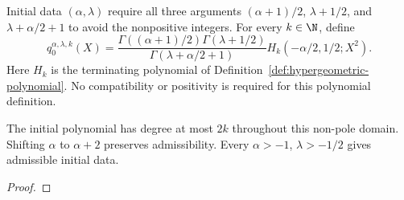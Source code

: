\begin{supporting}
\begin{definition}
\label{def:power-law-initial-polynomial}
\leanok
Initial data $(\alpha,\lambda)$ require all three arguments
$(\alpha+1)/2$, $\lambda+1/2$, and $\lambda+\alpha/2+1$ to avoid the
nonpositive integers. For every $k\in\N$, define
\[
 q_0^{\alpha,\lambda,k}(X)=
 \frac{\Gamma((\alpha+1)/2)\Gamma(\lambda+1/2)}{\Gamma(\lambda+\alpha/2+1)}
 H_k(-\alpha/2,1/2;X^2).
\]
Here $H_k$ is the terminating polynomial of Definition~\ref{def:hypergeometric-polynomial}.
No compatibility or positivity is required for this polynomial definition.
\end{definition}
\begin{theorem}
\label{thm:power-law-initial-polynomial}
\leanok
The initial polynomial has degree at most $2k$ throughout this non-pole domain.
Shifting $\alpha$ to $\alpha+2$ preserves admissibility. Every
$\alpha>-1$, $\lambda>-1/2$ gives admissible initial data.
\end{theorem}
\begin{proof}
\leanok
\end{proof}


\end{supporting}
